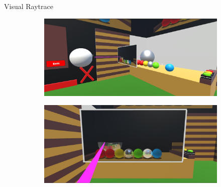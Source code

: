 \documentclass[final,hyperref={pdfpagelabels=false}]{beamer}
\begin{document}
\begin{frame}[t]
\begin{columns}[t]
\begin{column}{.96\textwidth}
\begin{block}{Visual Raytrace}
\begin{figure}
        \begin{subfigure}[b]{0.49\textwidth}
        \includegraphics[width=\textwidth]{duringProcess}
        \end{subfigure}%
        \hfill%
        \begin{subfigure}[b]{0.49\textwidth}
        \includegraphics[width=\textwidth]{duringProcessEyeView}
        \end{subfigure}
       \end{figure}
       
     \vspace{1px}
	
	\begin{figure}
        

\end{figure}
\end{block}
\end{column}
\end{columns}
\end{frame}
\end{document}
